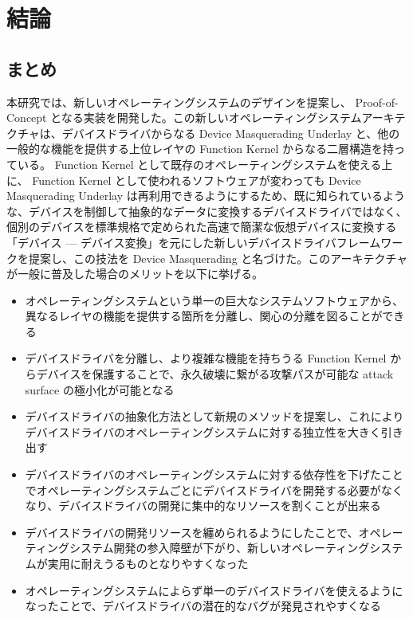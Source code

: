 \documentclass[a4paper,11pt,report]{ltjsbook}
\begin{document}
\chapter{結論}
\section{まとめ}

本研究では、新しいオペレーティングシステムのデザインを提案し、 Proof-of-Concept となる実装を開発した。この新しいオペレーティングシステムアーキテクチャは、デバイスドライバからなる Device Masquerading Underlay と、他の一般的な機能を提供する上位レイヤの Function Kernel からなる二層構造を持っている。 Function Kernel として既存のオペレーティングシステムを使える上に、 Function Kernel として使われるソフトウェアが変わっても Device Masquerading Underlay は再利用できるようにするため、既に知られているような、デバイスを制御して抽象的なデータに変換するデバイスドライバではなく、個別のデバイスを標準規格で定められた高速で簡潔な仮想デバイスに変換する「デバイス --- デバイス変換」を元にした新しいデバイスドライバフレームワークを提案し、この技法を Device Masquerading と名づけた。このアーキテクチャが一般に普及した場合のメリットを以下に挙げる。

\begin{itemize}
\item オペレーティングシステムという単一の巨大なシステムソフトウェアから、異なるレイヤの機能を提供する箇所を分離し、関心の分離を図ることができる
\item デバイスドライバを分離し、より複雑な機能を持ちうる Function Kernel からデバイスを保護することで、永久破壊に繋がる攻撃パスが可能な attack surface の極小化が可能となる
\item デバイスドライバの抽象化方法として新規のメソッドを提案し、これによりデバイスドライバのオペレーティングシステムに対する独立性を大きく引き出す
\item デバイスドライバのオペレーティングシステムに対する依存性を下げたことでオペレーティングシステムごとにデバイスドライバを開発する必要がなくなり、デバイスドライバの開発に集中的なリソースを割くことが出来る
\item デバイスドライバの開発リソースを纏められるようにしたことで、オペレーティングシステム開発の参入障壁が下がり、新しいオペレーティングシステムが実用に耐えうるものとなりやすくなった
\item オペレーティングシステムによらず単一のデバイスドライバを使えるようになったことで、デバイスドライバの潜在的なバグが発見されやすくなる
\end{itemize}
\end{document}

